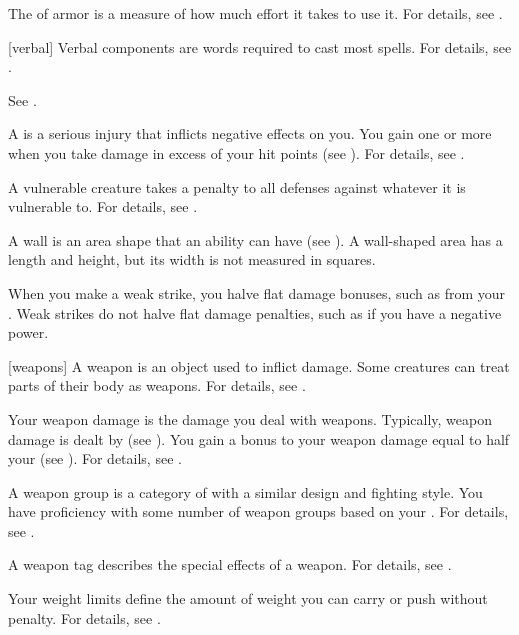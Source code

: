  The  of armor is a measure of how much effort it takes to use it.
For details, see .

[verbal] Verbal components are words required to cast most spells.
For details, see .

 See .

 A  is a serious injury that inflicts negative effects on you.
You gain one or more  when you take damage in excess of your hit points (see ).
For details, see .

 A vulnerable creature takes a  penalty to all defenses against whatever it is vulnerable to.
For details, see .

 A wall is an area shape that an ability can have (see ).
A wall-shaped area has a length and height, but its width is not measured in squares.

 When you make a weak strike, you halve flat damage bonuses, such as from your .
Weak strikes do not halve flat damage penalties, such as if you have a negative power.

[weapons] A weapon is an object used to inflict damage.
Some creatures can treat parts of their body as weapons.
For details, see .

 Your weapon damage is the damage you deal with weapons.
Typically, weapon damage is dealt by  (see ).
You gain a bonus to your weapon damage equal to half your  (see ).
For details, see .

 A weapon group is a category of  with a similar design and fighting style.
You have proficiency with some number of weapon groups based on your .
For details, see .

 A weapon tag describes the special effects of a weapon.
For details, see .

 Your weight limits define the amount of weight you can carry or push without penalty.
For details, see .

